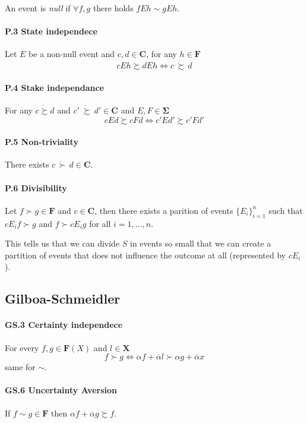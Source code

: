 \documentclass[landscape, 12pt]{extarticle}
\newcommand{\dsuccsim}{\ \dot \succsim \ }
\begin{document}
\begin{multicols}{2}
	An event is \textit{null} if $\forall f, g$ there holds $fEh \sim gEh$.

	\paragraph{P.3 State independece}
	Let $E$ be a non-null event and $c, d \in \bm C$, for any $h \in \bm F$
	\[
		cEh \succsim dEh \iff c\, \dot \succsim \, d
	\]

	\paragraph{P.4 Stake independance}
	For any $c \dot \succsim d$ and $c' \dsuccsim d' \in \bm C$
	and $E, F \in \bm \Sigma$
	\[
		cEd \succsim cFd \iff c'Ed'\succsim c'Fd'
	\]

	\paragraph{P.5 Non-triviality}
	There exists $c \, \dot \succ \, d \in \bm C$.

	\paragraph{P.6 Divisibility}
	Let $f \succ g \in \bm F$ and $c \in \bm C$,
	then there exists a parition of events $\{E_i\}^n_{i=1}$
	such that $cE_if \succ g$ and $f \succ cE_ig$ for all $i=1,\dots,n$.

	This tells us that we can divide $S$ in events so small that we can create
	a partition of events that does not influence the outcome at all (represented by $cE_i$).

	\subsection{Gilboa-Schmeidler}
	\paragraph{GS.3 Certainty independece}
	For every $f, g \in \bm F(X)$ and $l \in \bm X$
	\[
		f \succ g \iff \alpha f + \overline \alpha l \succ \alpha g + \overline \alpha x
	\]
	same for $\sim$.

	\paragraph{GS.6 Uncertainty Aversion}
	If $f \sim g \in \bm F$ then $\alpha f + \overline \alpha g \succsim f$.

\end{multicols}
\end{document}
